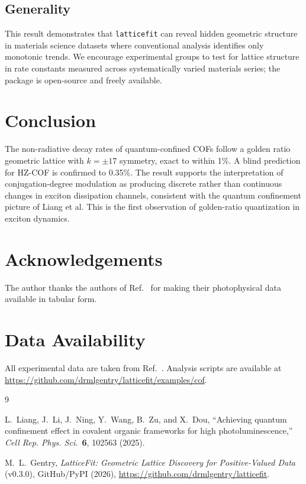 \documentclass[11pt,a4paper]{article}
\begin{document}
\subsection{Generality}

This result demonstrates that \texttt{latticefit} can reveal
hidden geometric structure in materials science datasets where
conventional analysis identifies only monotonic trends.
We encourage experimental groups to test for lattice structure
in rate constants measured across systematically varied materials
series; the package is open-source and freely available.

\section{Conclusion}

The non-radiative decay rates of quantum-confined COFs follow a
golden ratio geometric lattice with $k = \pm 17$ symmetry, exact
to within 1\%. A blind prediction for HZ-COF is confirmed to 0.35\%.
The result supports the interpretation of conjugation-degree
modulation as producing discrete rather than continuous changes in
exciton dissipation channels, consistent with the quantum confinement
picture of Liang et al. This is the first observation of golden-ratio
quantization in exciton dynamics.

\section*{Acknowledgements}

The author thanks the authors of Ref.~\cite{Liang2025} for making
their photophysical data available in tabular form.

\section*{Data Availability}

All experimental data are taken from Ref.~\cite{Liang2025}.
Analysis scripts are available at
\url{https://github.com/drmlgentry/latticefit/examples/cof}.

\begin{thebibliography}{9}

L.~Liang, J.~Li, J.~Ning, Y.~Wang, B.~Zu, and X.~Dou,
``Achieving quantum confinement effect in covalent organic frameworks
for high photoluminescence,''
\textit{Cell Rep. Phys. Sci.}\ \textbf{6}, 102563 (2025).

M.~L.~Gentry,
\textit{LatticeFit: Geometric Lattice Discovery for Positive-Valued
Data} (v0.3.0),
GitHub/PyPI (2026),
\url{https://github.com/drmlgentry/latticefit}.

\end{thebibliography}
\end{document}

